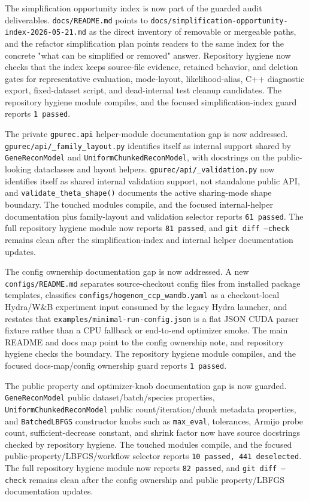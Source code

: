\documentclass[11pt]{article}
\begin{document}
The simplification opportunity index is now part of the guarded audit
deliverables.  \texttt{docs/README.md} points to
\texttt{docs/simplification-opportunity-index-2026-05-21.md} as the direct
inventory of removable or mergeable paths, and the refactor simplification plan
points readers to the same index for the concrete "what can be simplified or
removed" answer.  Repository hygiene now checks that the index keeps
source-file evidence, retained behavior, and deletion gates for representative
evaluation, mode-layout, likelihood-alias, C++ diagnostic export,
fixed-dataset script, and dead-internal test cleanup candidates.
The repository hygiene module compiles, and the focused simplification-index
guard reports \texttt{1 passed}.

The private \texttt{gpurec.api} helper-module documentation gap is now
addressed.  \texttt{gpurec/api/\_family\_layout.py} identifies itself as
internal support shared by \texttt{GeneReconModel} and
\texttt{UniformChunkedReconModel}, with docstrings on the public-looking
dataclasses and layout helpers.  \texttt{gpurec/api/\_validation.py} now
identifies itself as shared internal validation support, not standalone public
API, and \texttt{validate\_theta\_shape()} documents the active sharing-mode
shape boundary.
The touched modules compile, and the focused internal-helper documentation plus
family-layout and validation selector reports \texttt{61 passed}.
The full repository hygiene module now reports \texttt{81 passed}, and
\texttt{git diff --check} remains clean after the simplification-index and
internal helper documentation updates.

The config ownership documentation gap is now addressed.  A new
\texttt{configs/README.md} separates source-checkout config files from
installed package templates, classifies
\texttt{configs/hogenom\_ccp\_wandb.yaml} as a checkout-local Hydra/W\&B
experiment input consumed by the legacy Hydra launcher, and restates that
\texttt{examples/minimal-run-config.json} is a flat JSON CUDA parser fixture
rather than a CPU fallback or end-to-end optimizer smoke.  The main README and
docs map point to the config ownership note, and repository hygiene checks the
boundary.
The repository hygiene module compiles, and the focused docs-map/config
ownership guard reports \texttt{1 passed}.

The public property and optimizer-knob documentation gap is now guarded.
\texttt{GeneReconModel} public dataset/batch/species properties,
\texttt{UniformChunkedReconModel} public count/iteration/chunk metadata
properties, and \texttt{BatchedLBFGS} constructor knobs such as
\texttt{max\_eval}, tolerances, Armijo probe count, sufficient-decrease
constant, and shrink factor now have source docstrings checked by repository
hygiene.
The touched modules compile, and the focused public-property/LBFGS/workflow
selector reports \texttt{10 passed, 441 deselected}.
The full repository hygiene module now reports \texttt{82 passed}, and
\texttt{git diff --check} remains clean after the config ownership and public
property/LBFGS documentation updates.
\end{document}
